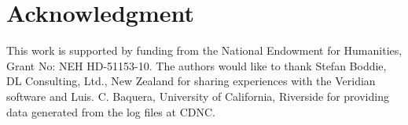 \documentclass{sig-alternate}
\begin{document}
\section*{Acknowledgment}
This work is supported by funding from the National Endowment for Humanities, Grant No: NEH HD-51153-10. The authors would like to thank Stefan Boddie, DL Consulting, Ltd., New Zealand for sharing experiences with the Veridian software and Luis. C. Baquera, University of California, Riverside for providing data generated from the log files at CDNC.\\

%
%
%

%
%
%
%
\end{document}
